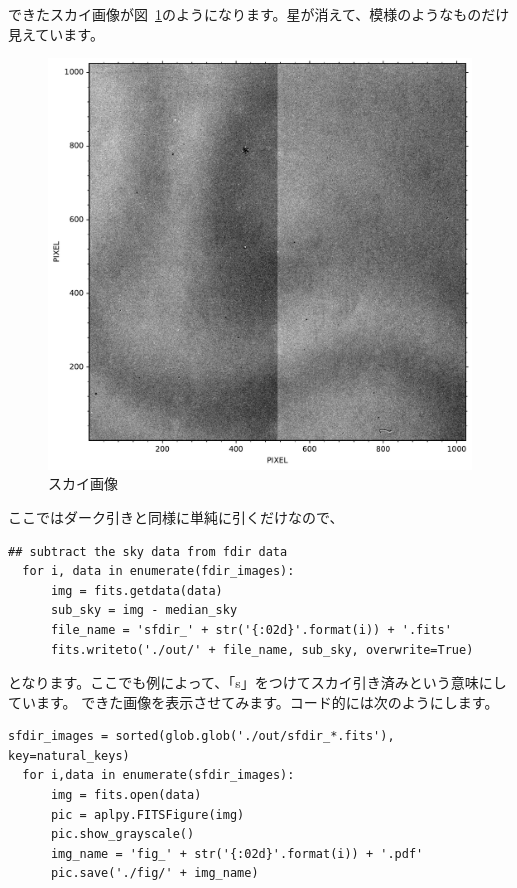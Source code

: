 できたスカイ画像が図~\ref{fig:sky_image}のようになります。星が消えて、模様のようなものだけ見えています。
\begin{figure}
  \centering
  \includegraphics[width=0.6\linewidth]{./fig/chap_5/sky_fits.pdf}
  \caption{スカイ画像}
  \label{fig:sky_image}
\end{figure}
ここではダーク引きと同様に単純に引くだけなので、
\begin{lstlisting}[caption=スカイ引き,label=code:subtract_sky]
  ## subtract the sky data from fdir data
  for i, data in enumerate(fdir_images):
      img = fits.getdata(data)
      sub_sky = img - median_sky
      file_name = 'sfdir_' + str('{:02d}'.format(i)) + '.fits'
      fits.writeto('./out/' + file_name, sub_sky, overwrite=True)
\end{lstlisting}
となります。ここでも例によって、「s」をつけてスカイ引き済みという意味にしています。
できた画像を表示させてみます。コード的には次のようにします。
\begin{lstlisting}[caption=作成した画像の表示,label=code:kansei]
  sfdir_images = sorted(glob.glob('./out/sfdir_*.fits'), key=natural_keys)
  for i,data in enumerate(sfdir_images):
      img = fits.open(data)
      pic = aplpy.FITSFigure(img)
      pic.show_grayscale()
      img_name = 'fig_' + str('{:02d}'.format(i)) + '.pdf'
      pic.save('./fig/' + img_name)
\end{lstlisting}


